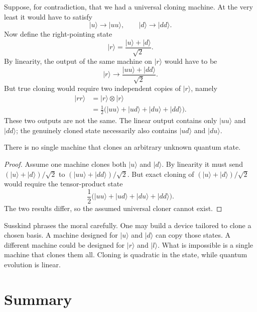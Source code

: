 Suppose, for contradiction, that we had a universal cloning machine. At the very least it would have to satisfy
\begin{equation}
|u\rangle \to |uu\rangle,
\qquad
|d\rangle \to |dd\rangle.
\end{equation}
Now define the right-pointing state
\begin{equation}
|r\rangle
=
\frac{|u\rangle+|d\rangle}{\sqrt{2}}.
\end{equation}
By linearity, the output of the same machine on \(|r\rangle\) would have to be
\begin{equation}
|r\rangle \to \frac{|uu\rangle+|dd\rangle}{\sqrt{2}}.
\end{equation}
But true cloning would require two independent copies of \(|r\rangle\), namely
\begin{align}
|rr\rangle
&=
|r\rangle\otimes |r\rangle \\
&=
\frac{1}{2}
\bigl(
|uu\rangle+|ud\rangle+|du\rangle+|dd\rangle
\bigr).
\end{align}
These two outputs are not the same. The linear output contains only \(|uu\rangle\) and \(|dd\rangle\); the genuinely cloned state necessarily also contains \(|ud\rangle\) and \(|du\rangle\).

\begin{theorem}[No-cloning]
There is no single machine that clones an arbitrary unknown quantum state.
\end{theorem}

\begin{proof}
Assume one machine clones both \(|u\rangle\) and \(|d\rangle\). By linearity it must send \((|u\rangle+|d\rangle)/\sqrt{2}\) to \((|uu\rangle+|dd\rangle)/\sqrt{2}\). But exact cloning of \((|u\rangle+|d\rangle)/\sqrt{2}\) would require the tensor-product state
\[
\frac{1}{2}
\bigl(
|uu\rangle+|ud\rangle+|du\rangle+|dd\rangle
\bigr).
\]
The two results differ, so the assumed universal cloner cannot exist.
\end{proof}

Susskind phrases the moral carefully. One may build a device tailored to clone a chosen basis. A machine designed for \(|u\rangle\) and \(|d\rangle\) can copy those states. A different machine could be designed for \(|r\rangle\) and \(|l\rangle\). What is impossible is a single machine that clones them all. Cloning is quadratic in the state, while quantum evolution is linear.

\section{Summary}

